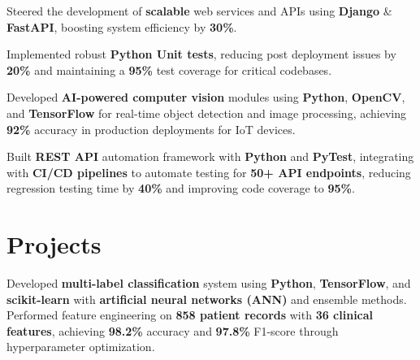 \documentclass[]{deedy-resume-openfont}
\begin{document}
\begin{minipage}[t]{0.61\textwidth}
\begin{tightemize}
\item Steered the development of \textbf{scalable} web services and APIs using \textbf{Django} \& \textbf{FastAPI}, boosting system efficiency by \textbf{30\%}.
\item Implemented robust \textbf{Python Unit tests}, reducing post deployment issues by \textbf{20\%} and maintaining a \textbf{95\%} test coverage for critical codebases.
\end{tightemize}
\sectionsep

\begin{tightemize}
\item Developed \textbf{AI-powered computer vision} modules using \textbf{Python}, \textbf{OpenCV}, and \textbf{TensorFlow} for real-time object detection and image processing, achieving \textbf{92\%} accuracy in production deployments for IoT devices.
\item Built \textbf{REST API} automation framework with \textbf{Python} and \textbf{PyTest}, integrating with \textbf{CI/CD pipelines} to automate testing for \textbf{50+ API endpoints}, reducing regression testing time by \textbf{40\%} and improving code coverage to \textbf{95\%}.
\end{tightemize}
\sectionsep


\section{Projects}
Developed \textbf{multi-label classification} system using \textbf{Python}, \textbf{TensorFlow}, and \textbf{scikit-learn} with \textbf{artificial neural networks (ANN)} and ensemble methods. Performed feature engineering on \textbf{858 patient records} with \textbf{36 clinical features}, achieving \textbf{98.2\%} accuracy and \textbf{97.8\%} F1-score through hyperparameter optimization.
\sectionsep



\end{minipage}
\end{document}
